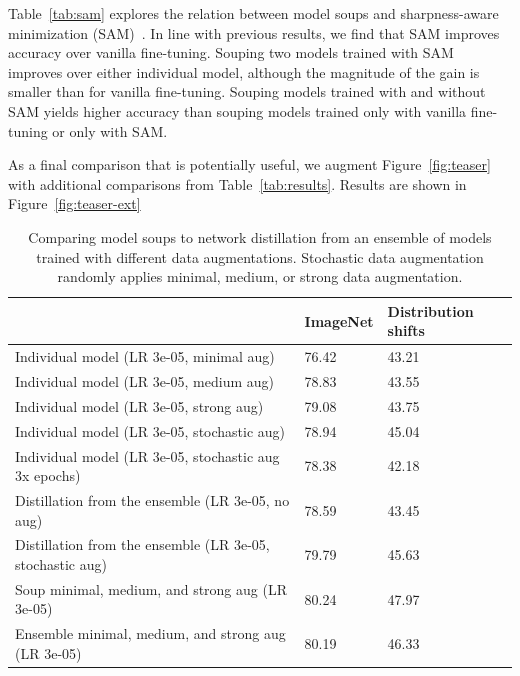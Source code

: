 \documentclass[nohyperref]{article}
\theoremstyle{plain}
\theoremstyle{definition}
\theoremstyle{remark}
\begin{document}
    Table~\ref{tab:sam} explores the relation between
    model soups and sharpness-aware minimization (SAM)~\cite{foret2021sharpnessaware}.
    In line with previous results, we find that SAM improves accuracy over vanilla fine-tuning. Souping two
    models trained with SAM improves over either individual model, although the magnitude of the gain is smaller than for vanilla fine-tuning. Souping models trained with and without SAM yields higher accuracy than souping models trained only with vanilla fine-tuning or only with SAM.
    
    As a final comparison that is potentially useful, we augment Figure~\ref{fig:teaser} with additional comparisons from Table~\ref{tab:results}. Results are shown in Figure~\ref{fig:teaser-ext}
    
    \begin{table}
        \caption{Comparing model soups to network distillation
        from an ensemble of models trained with different data augmentations.
        Stochastic data augmentation randomly applies minimal,
        medium, or strong data augmentation.}
        \begin{center}\footnotesize
        \setlength{\arrayrulewidth}{.01em}
        \begin{tabular}{lll}
            \toprule
            {} &              ImageNet &            Distribution shifts \\
            \midrule
            Individual model (LR 3e-05, minimal aug)                  &  76.42 &  43.21 \\
            Individual model (LR 3e-05, medium aug)                  &  78.83 &  43.55 \\
            Individual model (LR 3e-05, strong aug)               &  79.08 &  43.75 \\
            Individual model (LR 3e-05, stochastic aug)           &  78.94 &  45.04 \\
            Individual model (LR 3e-05, stochastic aug 3x epochs) &  78.38 &  42.18 \\
            Distillation from the ensemble (LR 3e-05, no aug)               &  78.59 &  43.45 \\
            Distillation from the ensemble (LR 3e-05, stochastic aug)       &  79.79 &  45.63 \\
            Soup minimal, medium, and strong aug (LR 3e-05)                              &  80.24 &  47.97 \\
            Ensemble minimal, medium, and strong aug (LR 3e-05)                          &  80.19 &  46.33 \\

\end{tabular}
\end{center}
\end{table}
\end{document}
